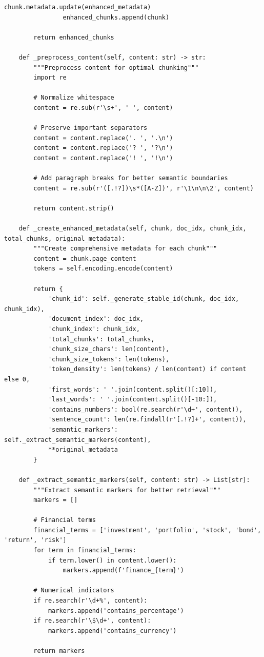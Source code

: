 \documentclass[12pt,a4paper]{article}
\begin{document}
\begin{lstlisting}[caption=Enhanced Document Splitter with Token Awareness]
                chunk.metadata.update(enhanced_metadata)
                enhanced_chunks.append(chunk)
        
        return enhanced_chunks
    
    def _preprocess_content(self, content: str) -> str:
        """Preprocess content for optimal chunking"""
        import re
        
        # Normalize whitespace
        content = re.sub(r'\s+', ' ', content)
        
        # Preserve important separators
        content = content.replace('. ', '.\n')
        content = content.replace('? ', '?\n')
        content = content.replace('! ', '!\n')
        
        # Add paragraph breaks for better semantic boundaries
        content = re.sub(r'([.!?])\s*([A-Z])', r'\1\n\n\2', content)
        
        return content.strip()
    
    def _create_enhanced_metadata(self, chunk, doc_idx, chunk_idx, total_chunks, original_metadata):
        """Create comprehensive metadata for each chunk"""
        content = chunk.page_content
        tokens = self.encoding.encode(content)
        
        return {
            'chunk_id': self._generate_stable_id(chunk, doc_idx, chunk_idx),
            'document_index': doc_idx,
            'chunk_index': chunk_idx,
            'total_chunks': total_chunks,
            'chunk_size_chars': len(content),
            'chunk_size_tokens': len(tokens),
            'token_density': len(tokens) / len(content) if content else 0,
            'first_words': ' '.join(content.split()[:10]),
            'last_words': ' '.join(content.split()[-10:]),
            'contains_numbers': bool(re.search(r'\d+', content)),
            'sentence_count': len(re.findall(r'[.!?]+', content)),
            'semantic_markers': self._extract_semantic_markers(content),
            **original_metadata
        }
    
    def _extract_semantic_markers(self, content: str) -> List[str]:
        """Extract semantic markers for better retrieval"""
        markers = []
        
        # Financial terms
        financial_terms = ['investment', 'portfolio', 'stock', 'bond', 'return', 'risk']
        for term in financial_terms:
            if term.lower() in content.lower():
                markers.append(f'finance_{term}')
        
        # Numerical indicators
        if re.search(r'\d+%', content):
            markers.append('contains_percentage')
        if re.search(r'\$\d+', content):
            markers.append('contains_currency')
        
        return markers
\end{lstlisting}
\end{document}
